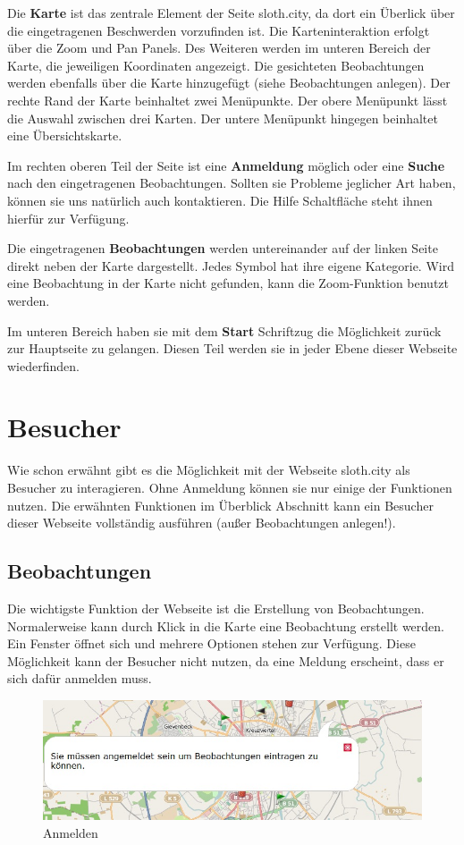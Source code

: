 \documentclass[a4paper,11pt]{scrartcl}
\begin{document}
Die \textbf{Karte} ist das zentrale Element der Seite sloth.city, da dort ein Überlick über die eingetragenen Beschwerden vorzufinden ist. Die Karteninteraktion erfolgt über die Zoom und Pan Panels. Des Weiteren werden im unteren Bereich der Karte, die jeweiligen Koordinaten angezeigt. Die gesichteten Beobachtungen werden ebenfalls über die Karte hinzugefügt (siehe Beobachtungen anlegen). Der rechte Rand der Karte beinhaltet zwei Menüpunkte. Der obere Menüpunkt lässt die Auswahl zwischen drei Karten. Der untere Menüpunkt hingegen beinhaltet eine Übersichtskarte. 

Im rechten oberen Teil der Seite ist eine \textbf{Anmeldung} möglich oder eine \textbf{Suche} nach den eingetragenen Beobachtungen. Sollten sie Probleme jeglicher Art haben, können sie uns natürlich auch kontaktieren. Die Hilfe Schaltfläche steht ihnen hierfür zur Verfügung.  

Die eingetragenen \textbf{Beobachtungen} werden untereinander auf der linken Seite direkt neben der Karte dargestellt. Jedes Symbol hat ihre eigene Kategorie. Wird eine Beobachtung in der Karte nicht gefunden, kann die Zoom-Funktion benutzt werden.

Im unteren Bereich haben sie mit dem \textbf{Start} Schriftzug die Möglichkeit zurück zur Hauptseite zu gelangen. Diesen Teil werden sie in jeder Ebene dieser Webseite wiederfinden.


\newpage

\section{Besucher}
Wie schon erwähnt gibt es die Möglichkeit mit der Webseite sloth.city als Besucher zu interagieren. Ohne Anmeldung können sie nur einige der Funktionen nutzen. 
Die erwähnten Funktionen im Überblick Abschnitt kann ein Besucher dieser Webseite vollständig ausführen (außer Beobachtungen anlegen!).

\subsection{Beobachtungen}
Die wichtigste Funktion der Webseite ist die Erstellung von Beobachtungen. Normalerweise kann durch Klick in die Karte eine Beobachtung erstellt werden. Ein Fenster öffnet sich und mehrere Optionen stehen zur Verfügung. Diese Möglichkeit kann der Besucher nicht nutzen, da eine Meldung erscheint, dass er sich dafür anmelden muss. 

\begin{figure}[h]
\centering
\includegraphics[width = 10 cm]{img/anmelden}
\caption{Anmelden}
\label{Anmelden}
\end{figure}
\end{document}
